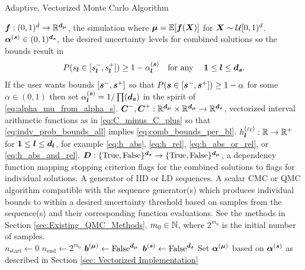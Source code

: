 \documentclass{article}[12pt]
\begin{document}
\begin{algorithm}[h!]
    \caption{Adaptive, Vectorized Monte Carlo Algorithm}
    \label{algo:MCStoppingCriterion}
    \begin{algorithmic}
    \Require $\boldsymbol{f}: (0,1)^d \to \mathbb{R}^{\boldsymbol{d}_{\boldsymbol{\mu}}}$, the simulation where $\boldsymbol{\mu} = \mathbb{E}[\boldsymbol{f}(\boldsymbol{X})]$ for $\boldsymbol{X} \sim \mathcal{U}[0,1)^d$.
    \Require $\boldsymbol{\alpha}^{(\boldsymbol{s})} \in (0,1)^{\boldsymbol{d}_{\boldsymbol{s}}}$, the desired uncertainty levels for combined solutions so the bounds result in
    \begin{equation}
        P(s_{\boldsymbol{l}} \in [s_{\boldsymbol{l}}^-,s_{\boldsymbol{l}}^+]) \geq 1-\alpha^{(\boldsymbol{s})}_{\boldsymbol{l}} \quad \text{for any}\quad \; \boldsymbol{1} \leq \boldsymbol{l} \leq \boldsymbol{d}_{\boldsymbol{s}}.
        \label{eq:comb_bounds_per_bl}
    \end{equation}
    If the user wants bounds $[\boldsymbol{s}^-,\boldsymbol{s}^+]$ so that $P(\boldsymbol{s} \in [\boldsymbol{s}^-,\boldsymbol{s}^+]) \geq 1-\alpha$ for some $\alpha \in (0,1)$ then set $\alpha_{\boldsymbol{l}}^{(\boldsymbol{s})} = 1/\prod(\boldsymbol{d}_{\boldsymbol{s}})$ in the spirit of \eqref{eq:alpha_mu_from_alpha_s}.
    \Require $\boldsymbol{C}^-,\boldsymbol{C}^+: \mathbb{R}^{\boldsymbol{d}_{\boldsymbol{\mu}}} \times \mathbb{R}^{\boldsymbol{d}_{\boldsymbol{\mu}}} \to \mathbb{R}^{\boldsymbol{d}_{\boldsymbol{s}}}$, vectorized interval arithmetic functions as in \eqref{eq:C_minus_C_plus} so that \eqref{eq:indv_prob_bounds_all} implies \eqref{eq:comb_bounds_per_bl}.
    \Require $h^{(\varepsilon_{\boldsymbol{l}})}_{\boldsymbol{l}}: \mathbb{R} \to \mathbb{R}^+$ for $\boldsymbol{1} \leq \boldsymbol{l} \leq \boldsymbol{d}_{\boldsymbol{l}}$, for example \eqref{eq:h_abs}, \eqref{eq:h_rel}, \eqref{eq:h_abs_or_rel}, or \eqref{eq:h_abs_and_rel}.
    \Require $\boldsymbol{D}: \{\text{True},\text{False}\}^{\boldsymbol{d}_{\boldsymbol{s}}} \to \{\text{True},\text{False}\}^{\boldsymbol{d}_{\boldsymbol{\mu}}}$, a dependency function mapping stopping criterion flags for the combined solutions to flags for individual solutions. 
    \Require A generator of IID or LD sequences.
    \Require A scalar CMC or QMC algorithm compatible with the sequence generator(s) which produces individual bounds to within a desired uncertainty threshold based on samples from the sequence(s) and their corresponding function evaluations. See the methods in Section \ref{sec:Existing_QMC_Methods}.
    \Require $m_0 \in \mathbb{N}$, where $2^{m_0}$ is the initial number of samples.
    \\ \hrulefill
    \State $n_\text{start} \gets 0$ 
    \State $n_\text{end} \gets 2^{m_0}$ 
    \State $\boldsymbol{b}^{(\boldsymbol{\mu})} \gets \text{False}^{\boldsymbol{d}_{\boldsymbol{\mu}}}$ 
    \State $\boldsymbol{b}^{(\boldsymbol{s})} \gets \text{False}^{\boldsymbol{d}_{\boldsymbol{s}}}$ 
    \State Set $\boldsymbol{\alpha}^{(\boldsymbol{\mu})}$ based on $\boldsymbol{\alpha}^{(\boldsymbol{s})}$ as described in Section \ref{sec: Vectorized Implementation}

\end{algorithmic}
\end{algorithm}
\end{document}
